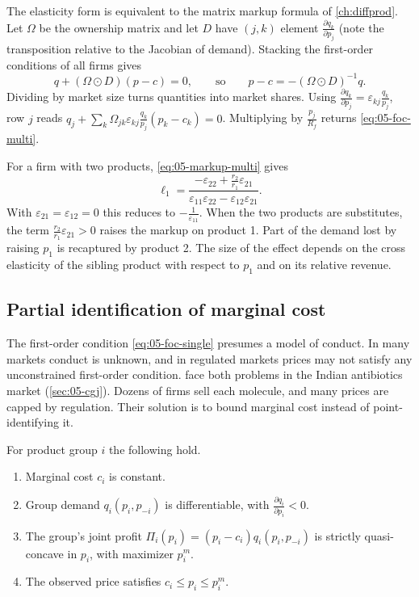The elasticity form is equivalent to the matrix markup formula of \cref{ch:diffprod}. Let $\Omega$ be the
ownership matrix and let $D$ have $(j,k)$ element $\frac{\partial q_k}{\partial p_j}$ (note the transposition
relative to the Jacobian of demand). Stacking the first-order conditions of all firms gives
\begin{equation*}
  q + (\Omega\odot D)(p - c) = 0, \qquad\text{so}\qquad p - c = -(\Omega\odot D)^{-1}q.
\end{equation*}
Dividing by market size turns quantities into market shares. Using $\frac{\partial q_k}{\partial p_j} =
\varepsilon_{kj}\frac{q_k}{p_j}$, row $j$ reads $q_j + \sum_k\Omega_{jk}\varepsilon_{kj}\frac{q_k}{p_j}(p_k - c_k) = 0$.
Multiplying by $\frac{p_j}{R_f}$ returns \eqref{eq:05-foc-multi}.

For a firm with two products, \eqref{eq:05-markup-multi} gives
\begin{equation}\label{eq:05-lerner-two}
  \ell_1 = \frac{-\varepsilon_{22} + \frac{r_2}{r_1}\varepsilon_{21}}{\varepsilon_{11}\varepsilon_{22} - \varepsilon_{12}\varepsilon_{21}}.
\end{equation}
With $\varepsilon_{21} = \varepsilon_{12} = 0$ this reduces to $-\frac{1}{\varepsilon_{11}}$. When the two
products are substitutes, the term $\frac{r_2}{r_1}\varepsilon_{21} > 0$ raises the markup on product 1. Part of
the demand lost by raising $p_1$ is recaptured by product 2. The size of the effect depends on the cross
elasticity of the sibling product with respect to $p_1$ and on its relative revenue.

\subsection{Partial identification of marginal cost}\label{sec:05-welfare-bounds}

The first-order condition \eqref{eq:05-foc-single} presumes a model of conduct. In many markets conduct is
unknown, and in regulated markets prices may not satisfy any unconstrained first-order condition.
\citet{ChaudhuriGoldbergJia2006} face both problems in the Indian antibiotics market (\cref{sec:05-cgj}).
Dozens of firms sell each molecule, and many prices are capped by regulation. Their solution is to bound
marginal cost instead of point-identifying it.

\begin{assumption}\label{ass:05-conduct-order}
For product group $i$ the following hold.
\begin{enumerate}[label=(\roman*)]
  \item Marginal cost $c_i$ is constant.
  \item Group demand $q_i(p_i,p_{-i})$ is differentiable, with $\frac{\partial q_i}{\partial p_i} < 0$.
  \item The group's joint profit $\Pi_i(p_i) = (p_i - c_i)q_i(p_i,p_{-i})$ is strictly quasi-concave in $p_i$,
  with maximizer $p_i^m$.
  \item The observed price satisfies $c_i \le p_i \le p_i^m$.
\end{enumerate}
\end{assumption}

